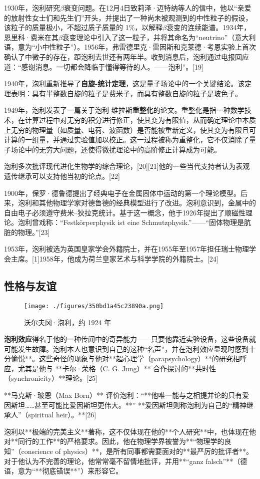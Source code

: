 1930年，泡利研究\(\beta\)衰变问题。在12月4日致莉泽·迈特纳等人的信中，他以“亲爱的放射性女士们和先生们”开头，并提出了一种尚未被观测到的中性粒子的假设，该粒子的质量极小，不超过质子质量的 1\%，以解释\(\beta\)衰变的连续能谱。1934年，恩里科·费米在其\(\beta\)衰变理论中引入了这一粒子，并将其命名为“neutrino”（意大利语，意为“小中性粒子”）。1956年，弗雷德里克·雷因斯和克莱德·考恩实验上首次确认了中微子的存在，距泡利去世还有两年半。收到消息后，泡利通过电报回应道：“感谢消息。一切都会降临于懂得等待的人。——泡利”。[19]

1940年，泡利重新推导了\textbf{自旋-统计定理}，这是量子场论中的一个关键结论。该定理表明：具有半整数自旋的粒子是费米子，而具有整数自旋的粒子是玻色子。

1949年，泡利发表了一篇关于泡利-维拉斯\textbf{重整化}的论文。重整化是指一种数学技术，在计算过程中对无穷的积分进行修正，使其变为有限值，从而确定理论中本质上无穷的物理量（如质量、电荷、波函数）是否能被重新定义，使其变为有限且可计算的一组量，并通过实验值加以校正。这一过程被称为重整化，它不仅消除了量子场论中的无穷大问题，还使得微扰理论中的高阶修正计算成为可能。

泡利多次批评现代进化生物学的综合理论，[20][21]他的一些当代支持者认为表观遗传继承可以支持他当初的论点。[22]

1900年，保罗·德鲁德提出了经典电子在金属固体中运动的第一个理论模型。后来，泡利和其他物理学家对德鲁德的经典模型进行了改进。泡利意识到，金属中的自由电子必须遵守费米–狄拉克统计。基于这一概念，他于1926年提出了顺磁性理论。泡利曾戏称：“Festkörperphysik ist eine Schmutzphysik.”——“固体物理是肮脏的物理。”[23]

1953年，泡利被选为英国皇家学会外籍院士，并在1955年至1957年担任瑞士物理学会主席。[1]1958年，他成为荷兰皇家艺术与科学学院的外籍院士。[24]
\subsection{性格与友谊}
\begin{figure}[ht]
\centering
\texttt{[image: ./figures/350bd1a45c23890a.png]}
\caption{沃尔夫冈·泡利，约 1924 年} \label{fig_Pauli2_4}
\end{figure}
\textbf{泡利效应}得名于他的一种传闻中的奇异能力——只要他靠近实验设备，这些设备就可能发生故障。泡利本人也意识到自己的这种“名声”，并在泡利效应显现时感到十分愉悦**。这些奇怪的现象与他对**超心理学（parapsychology）**的研究相呼应，尤其是他与 **卡尔·荣格（C. G. Jung）** 合作探讨的**共时性（synchronicity）**理论。[25]  

**马克斯·玻恩（Max Born）** 评价泡利：“**他唯一能与之相提并论的只有爱因斯坦……甚至可能比爱因斯坦更伟大。**” **爱因斯坦则称泡利为自己的“精神继承人”（spiritual heir）。**[26]  

泡利以**极端的完美主义**著称，这不仅体现在他的**个人研究**中，也体现在他对**同行的工作**的严格要求。因此，他在物理学界被誉为**“物理学的良知”（conscience of physics）**，是所有同事都需要面对的**最严厉的批评者**。对于他认为不完善的理论，他常常毫不留情地批评，并用**“ganz falsch”**（德语，意为“**彻底错误**”）来形容它。